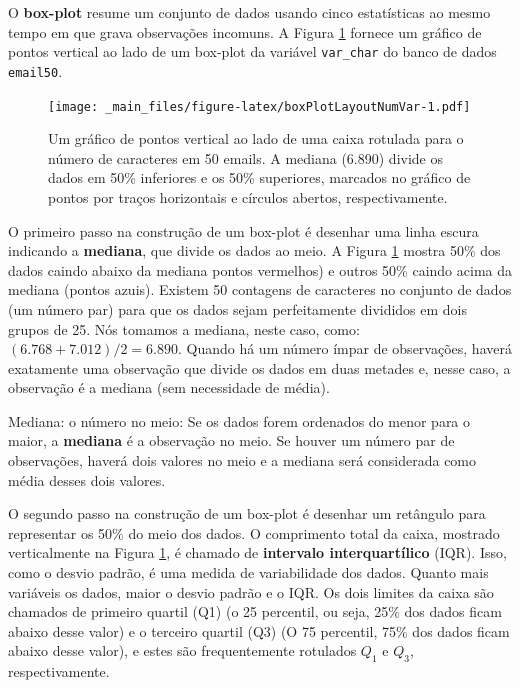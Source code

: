 \documentclass[
]{book}
\theoremstyle{definition}
\theoremstyle{definition}
\theoremstyle{definition}
\theoremstyle{definition}
\theoremstyle{remark}
\begin{document}
O \textbf{box-plot} resume um conjunto de dados usando cinco estatísticas ao mesmo tempo em que grava observações incomuns. A Figura \ref{fig:boxPlotLayoutNumVar} fornece um gráfico de pontos vertical ao lado de um box-plot da variável \texttt{var\_char} do banco de dados \texttt{email50}.

\begin{figure}
\centering
\texttt{[image: \_main\_files/figure-latex/boxPlotLayoutNumVar-1.pdf]}
\caption{\label{fig:boxPlotLayoutNumVar}Um gráfico de pontos vertical ao lado de uma caixa rotulada para o número de caracteres em 50 emails. A mediana (6.890) divide os dados em 50\% inferiores e os 50\% superiores, marcados no gráfico de pontos por traços horizontais e círculos abertos, respectivamente.}
\end{figure}

O primeiro passo na construção de um box-plot é desenhar uma linha escura indicando a \textbf{mediana}, que divide os dados ao meio. A Figura \ref{fig:boxPlotLayoutNumVar} mostra 50\% dos dados caindo abaixo da mediana pontos vermelhos) e outros 50\% caindo acima da mediana (pontos azuis). Existem 50 contagens de caracteres no conjunto de dados (um número par) para que os dados sejam perfeitamente divididos em dois grupos de 25. Nós tomamos a mediana, neste caso, como: \((\text{6.768} + \text{7.012}) / 2 = \text{6.890}\). Quando há um número ímpar de observações, haverá exatamente uma observação que divide os dados em duas metades e, nesse caso, a observação é a mediana (sem necessidade de média).

Mediana: o número no meio: Se os dados forem ordenados do menor para o maior, a \textbf{mediana} é a observação no meio. Se houver um número par de observações, haverá dois valores no meio e a mediana será considerada como média desses dois valores.

O segundo passo na construção de um box-plot é desenhar um retângulo para representar os 50\% do meio dos dados. O comprimento total da caixa, mostrado verticalmente na Figura \ref{fig:boxPlotLayoutNumVar}, é chamado de \textbf{intervalo interquartílico} (IQR). Isso, como o desvio padrão, é uma medida de variabilidade dos dados. Quanto mais variáveis os dados, maior o desvio padrão e o IQR. Os dois limites da caixa são chamados de primeiro quartil (Q1) (o 25 percentil, ou seja, 25\% dos dados ficam abaixo desse valor) e o terceiro quartil (Q3) (O 75 percentil, 75\% dos dados ficam abaixo desse valor), e estes são frequentemente rotulados \(Q_1\) e \(Q_3\), respectivamente.
\end{document}
